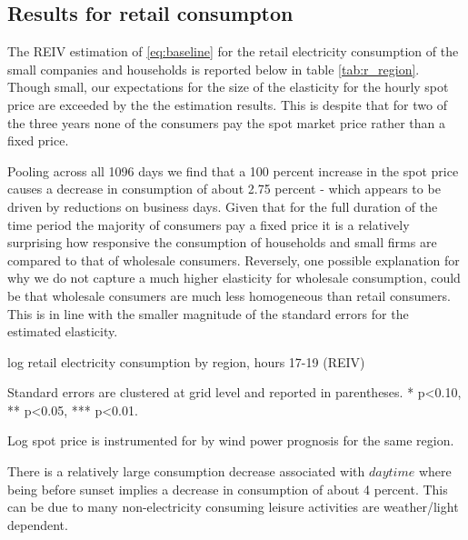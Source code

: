 \subsection{Results for retail consumpton}
The REIV estimation of \eqref{eq:baseline} for the retail electricity consumption of the small companies and households is reported below in table \ref{tab:r_region}. Though small, our expectations for the size of the elasticity for the hourly spot price are exceeded by the the estimation results. This is despite that for two of the three years none of the consumers pay the spot market price rather than a fixed price.

Pooling across all 1096 days we find that a 100 percent increase in the spot price causes a decrease in consumption of about 2.75 percent - which appears to be driven by reductions on business days. Given that for the full duration of the time period the majority of consumers pay a fixed price it is a relatively surprising how responsive the consumption of households and small firms are compared to that of wholesale consumers. Reversely, one possible explanation for why we do not capture a much higher elasticity for wholesale consumption, could be that wholesale consumers are much less homogeneous than retail consumers. This is in line with the smaller magnitude of the standard errors for the estimated elasticity.
\label{subsec:r_households}
\begin{table}[H]
\begin{threeparttable}
  \centering
  \caption{log retail electricity consumption by region, hours 17-19 (REIV)}
  \label{tab:r_region}
  \footnotesize
    
    \begin{tablenotes}
    \item Standard errors are clustered at grid level and reported in parentheses. * p<0.10, ** p<0.05, *** p<0.01.
    \item Log spot price is instrumented for by wind power prognosis for the same region.
  \end{tablenotes}
\end{threeparttable}
\end{table}
There is a relatively large consumption decrease associated with $daytime$ where being before sunset implies a decrease in consumption of about 4 percent. This can be due to many non-electricity consuming leisure activities are weather/light dependent.

